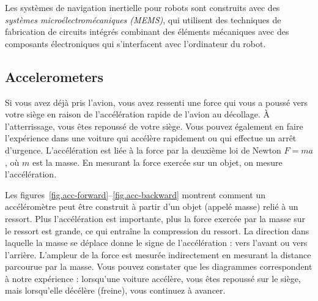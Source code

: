 {Les systèmes de navigation inertielle pour robots sont construits avec des \emph{systèmes microélectromécaniques (MEMS)}, qui utilisent des techniques de fabrication de circuits intégrés combinant des éléments mécaniques avec des composants électroniques qui s'interfacent avec l'ordinateur du robot.

\subsection{Accelerometers}\label{s.accelerometer}

Si vous avez déjà pris l'avion, vous avez ressenti une force qui vous a poussé vers votre siège en raison de l'accélération rapide de l'avion au décollage. À l'atterrissage, vous êtes repoussé de votre siège. Vous pouvez également en faire l'expérience dans une voiture qui accélère rapidement ou qui effectue un arrêt d'urgence. L'accélération est liée à la force par la deuxième loi de Newton $F=ma$, où $m$ est la masse. En mesurant la force exercée sur un objet, on mesure l'accélération.

Les figures~\ref{fig.acc-forward}--\ref{fig.acc-backward} montrent comment un accéléromètre peut être construit à partir d'un objet (appelé masse) relié à un ressort. Plus l'accélération est importante, plus la force exercée par la masse sur le ressort est grande, ce qui entraîne la compression du ressort. La direction dans laquelle la masse se déplace donne le signe de l'accélération : vers l'avant ou vers l'arrière. L'ampleur de la force est mesurée indirectement en mesurant la distance parcourue par la masse. Vous pouvez constater que les diagrammes correspondent à notre expérience : lorsqu'une voiture accélère, vous êtes repoussé sur le siège, mais lorsqu'elle décélère (freine), vous continuez à avancer.

}

